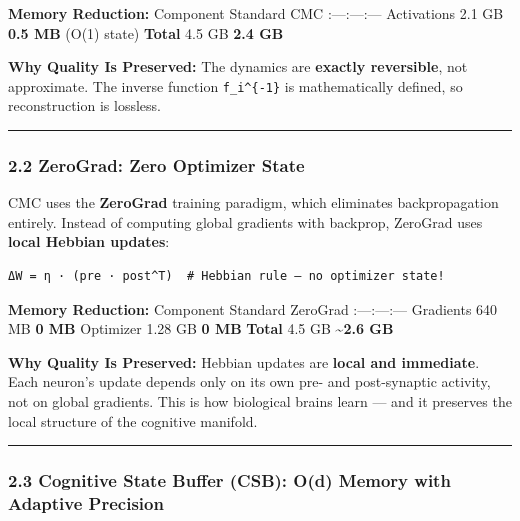 \documentclass[
  11pt,
  a4paper,
]{article}
\begin{document}
\textbf{Memory Reduction:} \textbar{} Component \textbar{} Standard
\textbar{} CMC \textbar{} \textbar:---\textbar:---\textbar:---\textbar{}
\textbar{} Activations \textbar{} 2.1 GB \textbar{} \textbf{0.5 MB}
(O(1) state) \textbar{} \textbar{} \textbf{Total} \textbar{} 4.5 GB
\textbar{} \textbf{2.4 GB} \textbar{}

\textbf{Why Quality Is Preserved:} The dynamics are \textbf{exactly
reversible}, not approximate. The inverse function
\texttt{f\_i\^{}\{-1\}} is mathematically defined, so reconstruction is
lossless.

\begin{center}\rule{0.5\linewidth}{0.5pt}\end{center}

\subsubsection{2.2 ZeroGrad: Zero Optimizer
State}\label{zerograd-zero-optimizer-state}

CMC uses the \textbf{ZeroGrad} training paradigm, which eliminates
backpropagation entirely. Instead of computing global gradients with
backprop, ZeroGrad uses \textbf{local Hebbian updates}:

\begin{verbatim}
ΔW = η · (pre · post^T)  # Hebbian rule — no optimizer state!
\end{verbatim}

\textbf{Memory Reduction:} \textbar{} Component \textbar{} Standard
\textbar{} ZeroGrad \textbar{}
\textbar:---\textbar:---\textbar:---\textbar{} \textbar{} Gradients
\textbar{} 640 MB \textbar{} \textbf{0 MB} \textbar{} \textbar{}
Optimizer \textbar{} 1.28 GB \textbar{} \textbf{0 MB} \textbar{}
\textbar{} \textbf{Total} \textbar{} 4.5 GB \textbar{}
\textbf{\textasciitilde2.6 GB} \textbar{}

\textbf{Why Quality Is Preserved:} Hebbian updates are \textbf{local and
immediate}. Each neuron's update depends only on its own pre- and
post-synaptic activity, not on global gradients. This is how biological
brains learn --- and it preserves the local structure of the cognitive
manifold.

\begin{center}\rule{0.5\linewidth}{0.5pt}\end{center}

\subsubsection{2.3 Cognitive State Buffer (CSB): O(d) Memory with
Adaptive
Precision}\label{cognitive-state-buffer-csb-od-memory-with-adaptive-precision}
\end{document}
